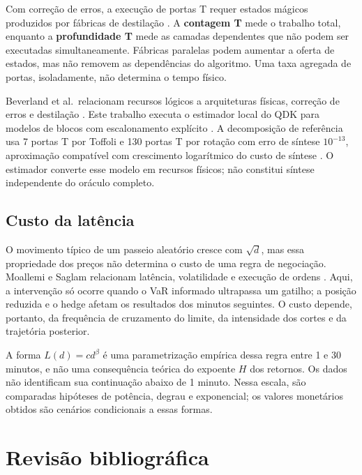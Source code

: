 \documentclass[conference,a4paper]{IEEEtran}
\begin{document}
Com correção de erros, a execução de portas T requer estados mágicos produzidos por fábricas de destilação \cite{babbush2021quadratic}. A \textbf{contagem T} mede o trabalho total, enquanto a \textbf{profundidade T} mede as camadas dependentes que não podem ser executadas simultaneamente. Fábricas paralelas podem aumentar a oferta de estados, mas não removem as dependências do algoritmo. Uma taxa agregada de portas, isoladamente, não determina o tempo físico.

Beverland et al.~relacionam recursos lógicos a arquiteturas físicas, correção de erros e destilação \cite{beverland2022requirements}. Este trabalho executa o estimador local do QDK para modelos de blocos com escalonamento explícito \cite{microsoft2026qre}. A decomposição de referência usa 7 portas T por Toffoli \cite{nielsen2010quantum} e 130 portas T por rotação com erro de síntese \(10^{-13}\), aproximação compatível com crescimento logarítmico do custo de síntese \cite{ross2016gridsynth}. O estimador converte esse modelo em recursos físicos; não constitui síntese independente do oráculo completo.

\subsection{Custo da latência}\label{custo-da-latuxeancia}

O movimento típico de um passeio aleatório cresce com \(\sqrt d\), mas essa propriedade dos preços não determina o custo de uma regra de negociação. Moallemi e Saglam relacionam latência, volatilidade e execução de ordens \cite{moallemi2013latency}. Aqui, a intervenção só ocorre quando o VaR informado ultrapassa um gatilho; a posição reduzida e o hedge afetam os resultados dos minutos seguintes. O custo depende, portanto, da frequência de cruzamento do limite, da intensidade dos cortes e da trajetória posterior.

A forma \(L(d)=cd^\beta\) é uma parametrização empírica dessa regra entre 1 e 30 minutos, e não uma consequência teórica do expoente \(H\) dos retornos. Os dados não identificam sua continuação abaixo de 1 minuto. Nessa escala, são comparadas hipóteses de potência, degrau e exponencial; os valores monetários obtidos são cenários condicionais a essas formas.

\section{Revisão bibliográfica}\label{revisuxe3o-bibliogruxe1fica}
\end{document}
